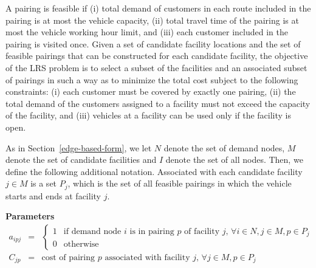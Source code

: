 A pairing is feasible if (i) total demand of customers in each route included in 
the pairing is at most the vehicle capacity, (ii) total travel time of
the pairing is at most the vehicle working hour limit, and (iii) each
customer included in the pairing is visited once.  Given a set of candidate 
facility locations and the set of feasible pairings that can be constructed 
for each candidate facility, the objective of the LRS problem is to select a 
subset of the facilities and an associated subset of pairings in such a way 
as to minimize the total cost subject to the following constraints: (i) each 
customer must be covered by exactly one pairing, (ii) the total demand of the 
customers assigned to a facility must not exceed the capacity of the facility, 
and (iii) vehicles at a facility can be used only if the facility is open. 

As in Section~\ref{edge-based-form}, we let $N$ denote the 
set of demand nodes, $M$ denote the set of candidate facilities and 
$I$ denote the set of all nodes. Then, we define the following
additional notation. Associated with each candidate
facility $j \in M$ is a set $P_j$, which is the set of all feasible 
pairings in which the vehicle starts and ends at facility $j$.  

{\bf Parameters}
\begin{eqnarray*}
a_{ipj} & = & \left \{  \begin{array}{ll}
                 1 & \mbox{if demand node $i$ is in pairing $p$ of facility $j$, $\forall i \in N, j \in M, p \in P_{j}$ } \\
                 0 & \mbox{otherwise}
                         \end{array}
              \right. \\
C_{jp} & = & \mbox{cost of pairing $p$ associated with facility $j$, $\forall j \in M, p \in P_{j}$}
\end{eqnarray*}

